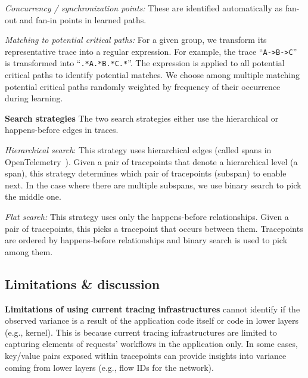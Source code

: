 \textit{Concurrency / synchronization points:}
These are identified automatically as fan-out and fan-in points in
learned paths.

\textit{Matching to potential critical paths:} For a given group, we transform
its representative trace into a regular expression.  
For example, the trace ``\texttt{A->B->C}'' is
transformed into ``\texttt{.*A.*B.*C.*}''.  The
expression is applied to all potential critical paths to identify
potential matches.  
We choose among multiple matching potential critical paths randomly
weighted by frequency of their occurrence during learning.



\noindent\textbf{Search strategies} The two search strategies either
use the hierarchical or happens-before edges in traces.


\textit{Hierarchical search}: This strategy
uses hierarchical edges (called spans in
OpenTelemetry~\cite{opentelemetry}).  Given a pair of tracepoints
that denote a hierarchical level (a span), this strategy determines
which pair of tracepoints (subspan) to enable next.  In the case where
there are multiple subspans, we use binary search to pick the middle
one.

\textit{Flat search:} This strategy uses only
the happens-before relationships.  Given a pair of tracepoints, this
picks a tracepoint that occurs between them.
Tracepoints are ordered by happens-before
relationships and binary search is used to pick among them.

\subsection{Limitations \& discussion}
\label{sec:limitations}

\noindent\textbf{Limitations of using current tracing infrastructures}
\STAIF{} cannot identify if the observed variance
is a result of the application code itself or code in lower layers
(e.g., kernel).  This is because current tracing
infrastructures are limited to capturing elements of requests' workflows
in the application only.  In some cases, key/value pairs exposed
within tracepoints can provide insights into variance coming from
lower layers (e.g., flow IDs for the network).

